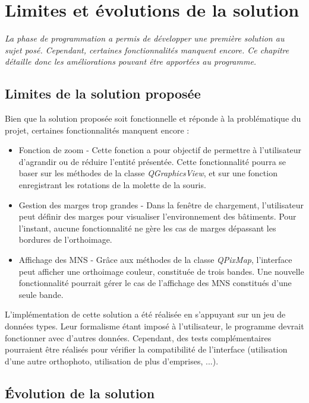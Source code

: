 \chapter[Limites et évolutions de la solution]{Limites et évolutions de la solution}

\textit{La phase de programmation a permis de développer une première solution au sujet posé. Cependant, certaines fonctionnalités manquent encore. Ce chapitre détaille donc les améliorations pouvant être apportées au programme.}

\section{Limites de la solution proposée}

Bien que la solution proposée soit fonctionnelle et réponde à la problématique du projet, certaines fonctionnalités manquent encore :
\begin{itemize}[label=$\rightarrow$]
	\item Fonction de zoom -  Cette fonction a pour objectif de permettre à l'utilisateur d'agrandir ou de réduire l'entité présentée. Cette fonctionnalité pourra se baser sur les méthodes de la classe \textit{QGraphicsView}, et sur une fonction enregistrant les rotations de la molette de la souris.
	\item Gestion des marges trop grandes - Dans la fenêtre de chargement, l'utilisateur peut définir des marges pour visualiser l'environnement des bâtiments. Pour l'instant, aucune fonctionnalité ne gère les cas de marges dépassant les bordures de l'orthoimage.
	\item Affichage des MNS - Grâce aux méthodes de la classe \textit{QPixMap}, l'interface peut afficher une orthoimage couleur, constituée de trois bandes. Une nouvelle fonctionnalité pourrait gérer le cas de l'affichage des MNS constitués d'une seule bande. \\
\end{itemize}

L'implémentation de cette solution a été réalisée en s'appuyant sur un jeu de données types. Leur formalisme étant imposé à l'utilisateur, le programme devrait fonctionner avec d'autres données. Cependant, des tests complémentaires pourraient être réalisés pour vérifier la compatibilité de l'interface (utilisation d'une autre orthophoto, utilisation de plus d'emprises, ...).

\section{Évolution de la solution}

